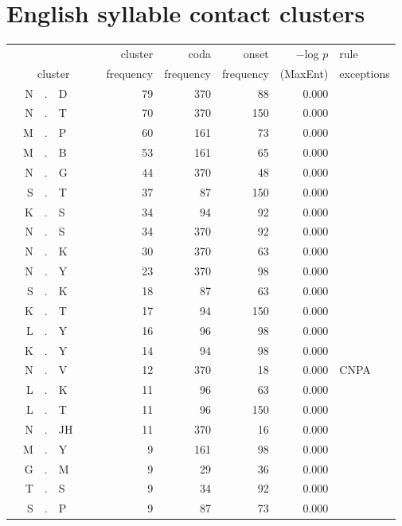 \chapter{English syllable contact clusters} 
\label{appendixC}

\begin{longtable}{r@{ } r@{ } c@{ } l@{ } l@{ } l@{ } r r r r l }
\toprule
 &   &   &  &   &  &  cluster  &  coda  &  onset  &  $-$log $p$  &  rule \\
\multicolumn{6}{c}{cluster}  &  frequency  &  frequency  &  frequency  &  (MaxEnt)  &  exceptions\\ 
\midrule
 & N & . & D &  &  & 79 & 370 & 88 & 0.000 &  \\
 & N & . & T &  &  & 70 & 370 & 150 & 0.000 &  \\
 & M & . & P &  &  & 60 & 161 & 73 & 0.000 &  \\
 & M & . & B &  &  & 53 & 161 & 65 & 0.000 &  \\
 & N & . & G &  &  & 44 & 370 & 48 & 0.000 &  \\
 & S & . & T &  &  & 37 & 87 & 150 & 0.000 &  \\
 & K & . & S &  &  & 34 & 94 & 92 & 0.000 &  \\
 & N & . & S &  &  & 34 & 370 & 92 & 0.000 &  \\
 & N & . & K &  &  & 30 & 370 & 63 & 0.000 &  \\
 & N & . & Y &  &  & 23 & 370 & 98 & 0.000 &  \\
 & S & . & K &  &  & 18 & 87 & 63 & 0.000 &  \\
 & K & . & T &  &  & 17 & 94 & 150 & 0.000 &  \\
 & L & . & Y &  &  & 16 & 96 & 98 & 0.000 &  \\
 & K & . & Y &  &  & 14 & 94 & 98 & 0.000 &  \\
 & N & . & V &  &  & 12 & 370 & 18 & 0.000 & \textsc{CNPA} \\
 & L & . & K &  &  & 11 & 96 & 63 & 0.000 &  \\
 & L & . & T &  &  & 11 & 96 & 150 & 0.000 &  \\
 & N & . & JH &  &  & 11 & 370 & 16 & 0.000 &  \\
 & M & . & Y &  &  & 9 & 161 & 98 & 0.000 &  \\
 & G & . & M &  &  & 9 & 29 & 36 & 0.000 &  \\
 & T & . & S &  &  & 9 & 34 & 92 & 0.000 &  \\
 & S & . & P &  &  & 9 & 87 & 73 & 0.000 &  \\

\end{longtable}
